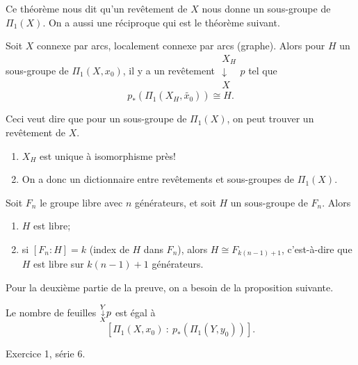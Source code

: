    Ce théorème nous dit qu'un revêtement de $X$ nous donne un sous-groupe de $\Pi_1(X)$. On a aussi une
   réciproque qui est le théorème suivant.

   \begin{theo} \label{thm:thm-2}
     Soit $X$ connexe par arcs, localement connexe par arcs (graphe). Alors pour $H$ un sous-groupe de
     $\Pi_1(X, x_0)$, il y a un revêtement $\substack{X_H\\\downarrow\\ X}p$ tel que 
       \[p_\ast(\Pi_1(X_H, \tilde{x_0})) \cong H.\]
   \end{theo}
   
   Ceci veut dire que pour un sous-groupe de $\Pi_1(X)$, on peut trouver un revêtement de $X$.

   \begin{rem}
     \begin{enumerate}
     \item $X_H$ est unique à isomorphisme près!
     \item On a donc un dictionnaire entre revêtements et sous-groupes de $\Pi_1(X)$. \qedhere
     \end{enumerate}
   \end{rem}



   \begin{theo} 
     Soit $F_n$ le groupe libre avec $n$ générateurs, et soit $H$ un sous-groupe de $F_n$. Alors
     \begin{enumerate}
     \item $H$ est libre;
     \item si $[F_n : H] = k$ (index de $H$ dans $F_n$), alors $H \cong F_{k(n-1)+1}$, c'est-à-dire que $H$
       est libre sur $k(n-1)+1$ générateurs.
     \end{enumerate}
   \end{theo}

   Pour la deuxième partie de la preuve, on a besoin de la proposition suivante.

   \begin{prop} \label{prop:prop-1}
     Le nombre de feuilles $\substack{Y\\\downarrow\\ X}p$ est égal à
       \[\left[ \Pi_1(X, x_0)\ :\ p_\ast\left(\Pi_1(Y, y_0) \right) \right].\]
   \end{prop}

   \begin{preuve}
     Exercice 1, série 6.
   \end{preuve}

